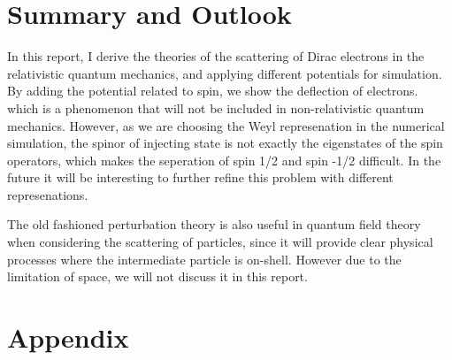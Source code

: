 \documentclass{article}
\numberwithin{equation}{section}
\begin{document}
\section{Summary and Outlook}
In this report, I derive the theories of the scattering of Dirac electrons in the relativistic quantum mechanics, and applying different potentials for simulation. By adding the potential related to spin, we show the deflection of electrons. which is a phenomenon that will not be included in non-relativistic quantum mechanics. However, as we are choosing the Weyl represenation in the numerical simulation, the spinor of injecting state is not exactly the eigenstates of the spin operators, which makes the seperation of spin 1/2 and spin -1/2 difficult. In the future it will be interesting to further refine this problem with different represenations.

The old fashioned perturbation theory is also useful in quantum field theory when considering the scattering of particles, since it will provide clear physical processes where the intermediate particle is on-shell. However due to the limitation of space, we will not discuss it in this report.





 


\section*{Appendix}        %

\end{document}
